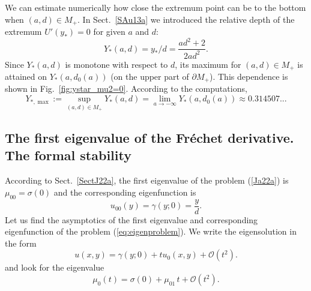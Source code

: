 \documentclass[oneside,a4paper,11pt]{article}
\theoremstyle{thmstyletwo}%
\theoremstyle{thmstylethree}%
\numberwithin{equation}{section}
\def\gamm{\gamma}
\def\Disp{\sigma}
\def\Obig{\mathcal{O}}
\begin{document}
We can estimate numerically how close the extremum point can be to the bottom when $(a,d)\in M_+$.  
In Sect.~\ref{SAu13a} we introduced the relative depth of the extremum $U'(y_*)=0$ for given $a$ and $d$:
\begin{equation*}
Y_*(a,d)=y_*/d=\frac{ad^2+2}{2ad^2}.
\end{equation*}
Since $Y_*(a,d)$ is monotone with respect to $d$,  its maximum for $(a,d)\in M_+$ is attained on $Y_*(a,d_0(a))$ (on the upper part of $\partial M_+$). This dependence is shown in Fig.~\ref{fig:ystar_mu2=0}. According to the computations,
\begin{equation*}%
Y_{*,\max}:=\sup_{(a,d)\in M_+}Y_*(a,d)=\lim_{a\to-\infty}Y_*(a,d_0(a))\approx 0.314507...
\end{equation*}

\subsection{The first eigenvalue of the Fr\'{e}chet derivative. The formal stability}\label{SFeb7c}

According to Sect.~\ref{SectJ22a}, the first eigenvalue of the problem (\ref{Ja22a}) is
$\mu_{00}=\Disp(0)$ and the corresponding eigenfunction is
$$
u_{00}(y)=\gamm(y;0)=\frac{y}{d}.
$$
Let us find the asymptotics of the first eigenvalue and corresponding eigenfunction of the problem (\ref{eq:eigenproblem}).
We write the eigensolution in the form
\begin{equation*}
u(x,y)=\gamm(y;0)+t u_0(x,y)+\Obig(t^2).
\end{equation*}
and look for the eigenvalue 
\begin{equation}
\mu_0(t)=\Disp(0)+\mu_{01}\,t+\Obig(t^2).
\label{eq:mu0expdef}
\end{equation}
\end{document}
